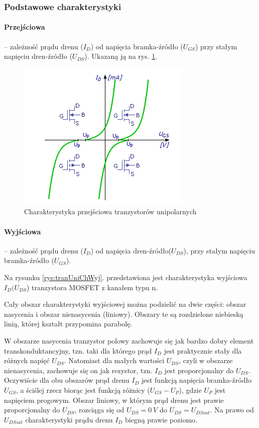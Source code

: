 \documentclass[a4paper,twoside]{report}
\begin{document}
\subsubsection{Podstawowe charakterystyki}

\paragraph{Przejściowa} – zależność prądu drenu ($I_D$) od napięcia bramka-źródło ($U_{GS}$) przy stałym napięciu dren-źródło ($U_{DS}$). Ukazaną ją na rys. \ref{rys:tranUniIdUgs}.

\begin{figure}[htbp]
\centering
\includegraphics[scale=0.9]{obrazy/tranzystory/tranunichar5.png}
\caption{Charakterystyka przejściowa tranzystorów unipolarnych}
\label{rys:tranUniIdUgs}
\end{figure}

\paragraph{Wyjściowa} – zależność prądu drenu ($I_D$) od napięcia dren-źródło($U_{DS}$), przy stałym napięciu bramka-źródło ($U_{GS}$).

Na rysunku \ref{rys:tranUniChWyj}. przedstawiona jest charakterystyka wyjściowa $I_D(U_{DS}$) tranzystora MOSFET z kanałem typu n.

Cały obszar charakterystyki wyjściowej można podzielić na dwie części: obszar nasycenia i obszar nienasycenia (liniowy). Obszary te są rozdzielone niebieską linią, której kształt przypomina parabolę.
   
W obszarze nasycenia tranzystor polowy zachowuje się jak bardzo dobry element transkonduktancyjny, tzn. taki dla którego prąd $I_D$ jest praktycznie stały dla różnych napięć $U_{DS}$. Natomiast dla małych wartości $U_{DS}$, czyli w obszarze nienasycenia, zachowuje się on jak rezystor, tzn. $I_D$ jest proporcjonalny do $U_{DS}$. Oczywiście dla obu obszarów prąd drenu $I_D$ jest funkcją napięcia bramka-źródło $U_{GS}$, a ściślej rzecz biorąc jest funkcją różnicy ($U_{GS} - U_P$), gdzie $U_P$ jest napięciem progowym. Obszar liniowy, w którym prąd drenu jest prawie proporcjonalny do $U_{DS}$, rozciąga się od $U_{DS}=0~V$ do $U_{DS}= U_{DSsat}$. Na prawo od $U_{DSsat}$ charakterystyki prądu drenu $I_D$ biegną prawie poziomo.
\end{document}
